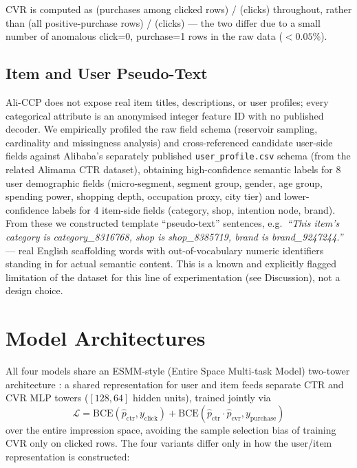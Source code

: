 CVR is computed as (purchases among clicked rows) / (clicks) throughout, rather than (all positive-purchase rows) / (clicks) --- the two differ due to a small number of anomalous click=0, purchase=1 rows in the raw data ($<0.05\%$).

\subsection{Item and User Pseudo-Text}

Ali-CCP does not expose real item titles, descriptions, or user profiles; every categorical attribute is an anonymised integer feature ID with no published decoder. We empirically profiled the raw field schema (reservoir sampling, cardinality and missingness analysis) and cross-referenced candidate user-side fields against Alibaba's separately published \texttt{user\_profile.csv} schema (from the related Alimama CTR dataset), obtaining high-confidence semantic labels for 8 user demographic fields (micro-segment, segment group, gender, age group, spending power, shopping depth, occupation proxy, city tier) and lower-confidence labels for 4 item-side fields (category, shop, intention node, brand). From these we constructed template ``pseudo-text'' sentences, e.g.\ \textit{``This item's category is category\_8316768, shop is shop\_8385719, brand is brand\_9247244.''} --- real English scaffolding words with out-of-vocabulary numeric identifiers standing in for actual semantic content. This is a known and explicitly flagged limitation of the dataset for this line of experimentation (see Discussion), not a design choice.

\section{Model Architectures}

All four models share an ESMM-style (Entire Space Multi-task Model) two-tower architecture \cite{ma2018esmm}: a shared representation for user and item feeds separate CTR and CVR MLP towers ($[128, 64]$ hidden units), trained jointly via
\[
\mathcal{L} = \text{BCE}(\hat{p}_{\text{ctr}}, y_{\text{click}}) + \text{BCE}(\hat{p}_{\text{ctr}} \cdot \hat{p}_{\text{cvr}}, y_{\text{purchase}})
\]
over the entire impression space, avoiding the sample selection bias of training CVR only on clicked rows. The four variants differ only in how the user/item representation is constructed:

